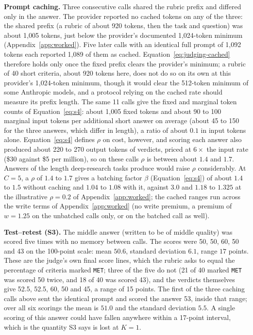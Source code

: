\documentclass[11pt]{article}
\begin{document}
\textbf{Prompt caching.} Three consecutive calls shared the rubric prefix and differed
only in the answer. The provider reported no cached tokens on any of the three: the
shared prefix (a rubric of about 920 tokens, then the task and question) was about 1{,}005 tokens, just below the provider's documented 1{,}024-token
minimum (Appendix~\ref{app:worked}). Five later calls with an identical full prompt of
1{,}092 tokens each reported 1{,}089 of them as cached. Equation~\ref{eq:judging-cached}
therefore holds only once the fixed prefix clears the provider's minimum; a rubric of
40 short criteria, about 920 tokens here, does not do so on its own at this provider's 1{,}024-token minimum, though it would clear the 512-token minimum of some Anthropic models, and a protocol relying on the cached rate
should measure its prefix length. The same 11 calls give the
fixed and marginal token counts of Equation~\ref{eq:s4}: about 1{,}005 fixed tokens and about
90 to 100 marginal input tokens per additional short answer on average (about 45 to 150 for the three answers, which differ in length), a ratio of about $0.1$ in input tokens alone. Equation~\ref{eq:s4} defines $\rho$ on cost, however, and scoring each answer also produced about 220 to 270 output tokens of verdicts, priced at $6\times$ the input rate (\$30 against \$5 per million), so on these calls $\rho$ is between about $1.4$ and $1.7$. Answers of the
length deep-research tasks produce would raise $\rho$ considerably. At $C = 5$, a $\rho$ of $1.4$ to $1.7$ gives a batching factor $\beta$ (Equation~\ref{eq:s4}) of about $1.4$ to $1.5$ without caching and $1.04$ to $1.08$ with it, against $3.0$ and $1.18$ to $1.325$ at the illustrative $\rho = 0.2$ of Appendix~\ref{app:worked}; the cached ranges run across the write terms of Appendix~\ref{app:worked} (no write premium, a premium of $w = 1.25$ on the unbatched calls only, or on the batched call as well).

\textbf{Test--retest (S3).} The middle answer (written to be of middle quality) was scored five times with no memory between
calls. The scores were 50, 50, 60, 50 and 43 on the 100-point scale: mean $50.6$, standard
deviation $6.1$, range $17$ points. These are the judge's own final score lines, which the rubric asks to equal the percentage of criteria marked \texttt{MET}; three of the five do not (21 of 40 marked \texttt{MET} was scored 50 twice, and 18 of 40 was scored 43), and the verdicts themselves give 52.5, 52.5, 60, 50 and 45, a range of 15 points. The first of the three caching calls above sent the identical prompt and scored the answer 53, inside that range; over all six scorings the mean is $51.0$ and the standard deviation $5.5$. A single scoring of this answer could have fallen anywhere within a 17-point interval, which is the quantity S3 says is lost at $K = 1$.
\end{document}
